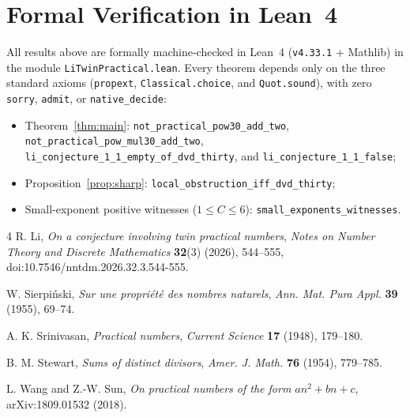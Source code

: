 \documentclass[11pt,a4paper]{article}
\begin{document}
\section{Formal Verification in Lean~4}

All results above are formally machine-checked in Lean~4 (\texttt{v4.33.1} + Mathlib) in the module \texttt{LiTwinPractical.lean}. Every theorem depends only on the three standard axioms (\texttt{propext}, \texttt{Classical.choice}, and \texttt{Quot.sound}), with zero \texttt{sorry}, \texttt{admit}, or \texttt{native\_decide}:
\begin{itemize}
\item Theorem~\ref{thm:main}: \texttt{not\_practical\_pow30\_add\_two}, \texttt{not\_practical\_pow\_mul30\_add\_two},\\
\texttt{li\_conjecture\_1\_1\_empty\_of\_dvd\_thirty}, and \texttt{li\_conjecture\_1\_1\_false};
\item Proposition~\ref{prop:sharp}: \texttt{local\_obstruction\_iff\_dvd\_thirty};
\item Small-exponent positive witnesses ($1 \le C \le 6$): \texttt{small\_exponents\_witnesses}.
\end{itemize}

\begin{thebibliography}{4}
R. Li,
\emph{On a conjecture involving twin practical numbers},
\emph{Notes on Number Theory and Discrete Mathematics} \textbf{32}(3) (2026), 544--555,
doi:10.7546/nntdm.2026.32.3.544-555.

W. Sierpi\'{n}ski,
\emph{Sur une propri\'{e}t\'{e} des nombres naturels},
\emph{Ann. Mat. Pura Appl.} \textbf{39} (1955), 69--74.

A. K. Srinivasan,
\emph{Practical numbers},
\emph{Current Science} \textbf{17} (1948), 179--180.

B. M. Stewart,
\emph{Sums of distinct divisors},
\emph{Amer. J. Math.} \textbf{76} (1954), 779--785.

L. Wang and Z.-W. Sun,
\emph{On practical numbers of the form $a n^2 + b n + c$},
arXiv:1809.01532 (2018).
\end{thebibliography}
\end{document}

